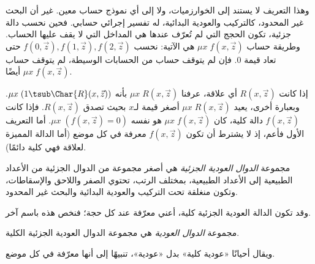 \documentclass[../../../include/open-logic-section]{subfiles}
\begin{document}
\begin{explain}
وهذا التعريف لا يستند إلى
الخوارزميات، ولا إلى أي نموذج حساب معين. غير أن البحث غير المحدود،
كالتركيب والعودية البدائية، له تفسير إجرائي حسابي. فحين نحسب
دالة جزئية، تكون الحجج التي لم تُعرّف عندها هي المداخل
التي لا يقف عليها الحساب. وطريقة حساب $\mu x\;f(x,\vec z)$ هي الآتية:
نحسب $f(0,\vec z), f(1,\vec z), f(2,\vec z)$ حتى تعاد قيمة
0. فإن لم يتوقف حساب من الحسابات الوسيطة، لم يتوقف حساب
$\mu x\;f(x,\vec z)$ أيضًا.
\end{explain}

إذا كانت $R(x,\vec z)$ أي علاقة، عرفنا $\mu x\;R(x,\vec z)$ بأنه
$\mu x\;(1\tsub\Char{R}(x,\vec z))$. وبعبارة أخرى، يعيد
$\mu x\;R(x,\vec z)$ أصغر قيمة لـ$x$ بحيث تصدق $R(x,\vec z)$.
فإذا كانت $f(x,\vec z)$ دالة كلية، كان $\mu x\;f(x,\vec z)$ هو نفسه
$\mu x\;(f(x,\vec z)=0)$. أما التعريف الأول فأعم، إذ لا يشترط
أن تكون $f(x,\vec z)$ معرفة في كل موضع (أما الدالة المميزة
لعلاقة فهي كلية دائمًا).

\begin{defn}
مجموعة \emph{الدوال العودية الجزئية} هي أصغر مجموعة من الدوال الجزئية
من الأعداد الطبيعية إلى الأعداد الطبيعية، بمختلف الرتب، تحتوي الصفر
واللاحق والإسقاطات، وتكون منغلقة تحت التركيب والعودية البدائية والبحث
غير المحدود.
\end{defn}

وقد تكون الدالة العودية الجزئية كلية، أعني معرّفة عند كل
حجة؛ فنخص هذه باسم آخر.

\begin{defn}
مجموعة \emph{الدوال العودية} هي مجموعة الدوال العودية الجزئية الكلية.
\end{defn}

ويقال أحيانًا «عودية كلية» بدل «عودية»، تنبيهًا إلى أنها معرّفة في كل
موضع.
\end{document}
